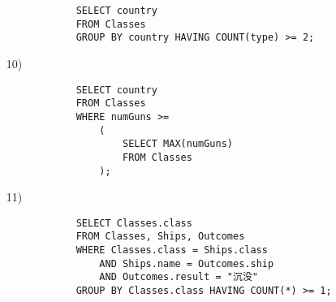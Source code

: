 \documentclass[10pt,a4paper]{article}
\begin{document}
\begin{enumerate}
\begin{verbatim}
            SELECT country
            FROM Classes
            GROUP BY country HAVING COUNT(type) >= 2;
        \end{verbatim}
        \item[10)]\begin{verbatim}
            SELECT country
            FROM Classes
            WHERE numGuns >=
                (
                    SELECT MAX(numGuns)
                    FROM Classes
                );
        \end{verbatim}
        \item[11)]\begin{verbatim}
            SELECT Classes.class
            FROM Classes, Ships, Outcomes
            WHERE Classes.class = Ships.class
                AND Ships.name = Outcomes.ship
                AND Outcomes.result = "沉没"
            GROUP BY Classes.class HAVING COUNT(*) >= 1;
        \end{verbatim}
    \end{enumerate}
\end{document}
